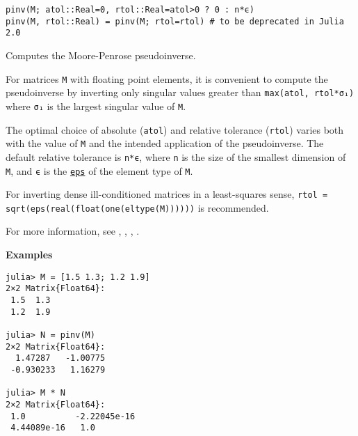 \begin{adjustwidth}{2em}{0pt}


\begin{verbatim}
pinv(M; atol::Real=0, rtol::Real=atol>0 ? 0 : n*ϵ)
pinv(M, rtol::Real) = pinv(M; rtol=rtol) # to be deprecated in Julia 2.0
\end{verbatim}

Computes the Moore-Penrose pseudoinverse.

For matrices \texttt{M} with floating point elements, it is convenient to compute the pseudoinverse by inverting only singular values greater than \texttt{max(atol, rtol*σ₁)} where \texttt{σ₁} is the largest singular value of \texttt{M}.

The optimal choice of absolute (\texttt{atol}) and relative tolerance (\texttt{rtol}) varies both with the value of \texttt{M} and the intended application of the pseudoinverse. The default relative tolerance is \texttt{n*ϵ}, where \texttt{n} is the size of the smallest dimension of \texttt{M}, and \texttt{ϵ} is the \hyperlink{11007691776383983215}{\texttt{eps}} of the element type of \texttt{M}.

For inverting dense ill-conditioned matrices in a least-squares sense, \texttt{rtol = sqrt(eps(real(float(one(eltype(M))))))} is recommended.

For more information, see \footnotemark[4], \footnotemark[5], \footnotemark[6], \footnotemark[7].

\textbf{Examples}


\begin{verbatim}
julia> M = [1.5 1.3; 1.2 1.9]
2×2 Matrix{Float64}:
 1.5  1.3
 1.2  1.9

julia> N = pinv(M)
2×2 Matrix{Float64}:
  1.47287   -1.00775
 -0.930233   1.16279

julia> M * N
2×2 Matrix{Float64}:
 1.0          -2.22045e-16
 4.44089e-16   1.0
\end{verbatim}



\end{adjustwidth}
